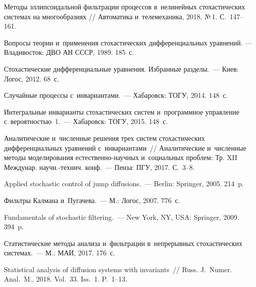 \begin{multicols}{2}
{{\begin{thebibliography}{99}
Методы эллипсоидальной фильтрации процессов в~нелинейных стохастических системах 
на многообразиях // Автоматика и~телемеханика, 2018. №\,1. С.~147--161.

 Вопросы теории и~применения стохастических дифференциальных уравнений. --- Владивосток: ДВО АН СССР, 1989. 185~с.

 Стохастические дифференциальные уравнения. Избранные разделы.~--- 
Киев: Логос, 2012. 68~с.

 Случайные процессы с~инвариантами.~--- Хабаровск: ТОГУ, 2014. 
148~с.

 Интегральные инварианты стохастических систем 
и~программное управление с~вероятностью~1.~--- Хабаровск: ТОГУ, 2015. 148~с.

 Аналитические и~численные решения 
трех систем стохастических дифференциальных уравнений с~инвариантами~// 
Аналитические и~численные методы моделирования ес\-те\-ст\-вен\-но-на\-уч\-ных 
и~социальных проблем: Тр. XII Междунар. научн.-технич. конф.~--- 
Пенза: ПГУ, 2017. С.~3--8.

 Applied stochastic control of jump diffusions.~--- 
Berlin: Springer, 2005. 214~p.

 Фильтры Калмана и~Пугачева.~--- М.: Логос, 2007. 
776~с.

 Fundamentals of stochastic filtering.~--- 
New York, NY, USA: Springer, 2009. 394~p.

 Статистические методы анализа и~фильтрации в~непрерывных 
стохастических системах.~--- М.: МАИ, 2017. 176~с.

Statistical analysis of diffusion systems with invariants~// Russ. 
J.~Numer. Anal.~M., 2018. Vol.~33. Iss.~1. P.~1--13.

 \end{thebibliography}

 }
 }

\end{multicols}

\vspace*{-3pt}

